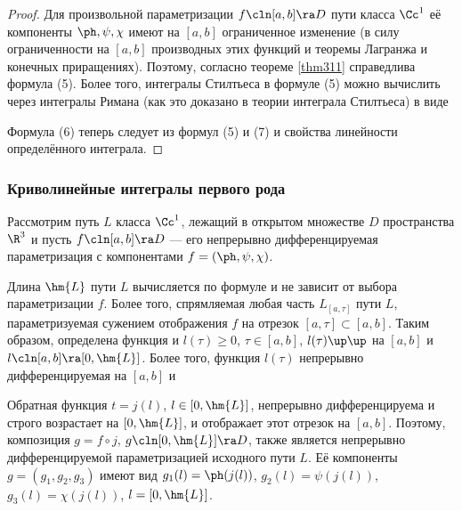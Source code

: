 \documentclass[a4paper]{article}
\begin{document}
\begin{proof}
Для произвольной параметризации $f\cln[a,b]\ra D$ пути класса
$\Cc^1$ её компоненты $\ph,\psi,\chi$ имеют на $[a,b]$ ограниченное
изменение (в силу ограниченности на $[a,b]$ производных этих функций
и теоремы Лагранжа и конечных приращениях). Поэтому, согласно
теореме \ref{thm311} справедлива формула (5). Более того, интегралы
Стилтьеса в формуле (5) можно вычислить через интегралы Римана (как
это доказано в теории интеграла Стилтьеса) в виде 

Формула (6) теперь следует из формул (5) и (7) и свойства линейности
определённого интеграла.
\end{proof}

\subsubsection{Криволинейные интегралы первого рода}

Рассмотрим путь $L$ класса $\Cc^1$, лежащий в открытом множестве $D$
пространства $\R^3$ и пусть $f\cln[a,b]\ra D$ --- его непрерывно
дифференцируемая параметризация с компонентами $f=(\ph,\psi,\chi)$.

Длина $\hm{L}$ пути $L$ вычисляется по формуле  и не
зависит от выбора параметризации $f$. Более того, спрямляемая любая
часть $L_{[a,\tau]}$ пути $L$, параметризуемая сужением отображения
$f$ на отрезок $[a,\tau]\subset[a,b]$. Таким образом, определена
функция  и $l(\tau)\ge0$, $\tau\in[a,b]$, $l(\tau)\up\up$ на
$[a,b]$ и $l\cln[a,b]\ra[0,\hm{L}]$. Более того, функция $l(\tau)$
непрерывно дифференцируемая на $[a,b]$ и

Обратная функция $t=j(l)$, $l\in[0,\hm{L}]$, непрерывно
дифференцируема и строго возрастает на $[0,\hm{L}]$, и отображает
этот отрезок на $[a,b]$. Поэтому, композиция $g=f\circ j$,
$g\cln[0,\hm{L}]\ra D$, также является непрерывно дифференцируемой
параметризацией исходного пути $L$. Её компоненты $g=(g_1,g_2,g_3)$
имеют вид $g_1(l)=\ph(j(l))$, $g_2(l)=\psi(j(l))$,
$g_3(l)=\chi(j(l))$, $l=[0,\hm{L}]$.
\end{document}
